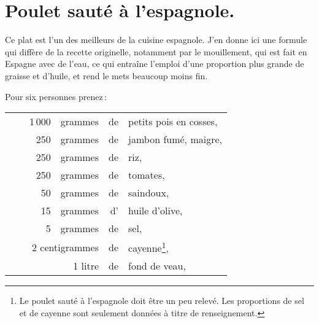 \section*{\centering Poulet sauté à l’espagnole.}
{}

Ce plat est l'un des meilleurs de la cuisine espagnole. J'en donne ici une
formule qui diffère de la recette originelle, notamment par le mouillement, qui
est fait en Espagne avec de l'eau, ce qui entraîne l'emploi d'une proportion
plus grande de graisse et d'huile, et rend le mets beaucoup moins fin.

\medskip

Pour six personnes prenez :

\footnotesize
\begin{longtable}{rrrrrp{18em}}
    & \hspace{2em}  & 1 000 & grammes &  de & petits pois en cosses,                                      \\
    & \hspace{2em}  &   250 & grammes &  de & jambon fumé, maigre,                                        \\
    & \hspace{2em}  &   250 & grammes &  de & riz,                                                        \\
    & \hspace{2em}  &   250 & grammes &  de & tomates,                                                    \\
    & \hspace{2em}  &    50 & grammes &  de & saindoux,                                                   \\
    & \hspace{2em}  &    15 & grammes &  d' & huile d'olive,                                              \\
    & \hspace{2em}  &     5 & grammes &  de & sel,                                                        \\
 & \multicolumn{3}{r}{2 centigrammes} &  de & cayenne\footnote{Le poulet sauté à l'espagnole doit être
                                              un peu relevé. Les proportions de sel et de cayenne sont
                                              seulement données à titre de renseignement.},               \\
    &               &       & 1 litre &  de & fond de veau,                                               \\

\end{longtable}
